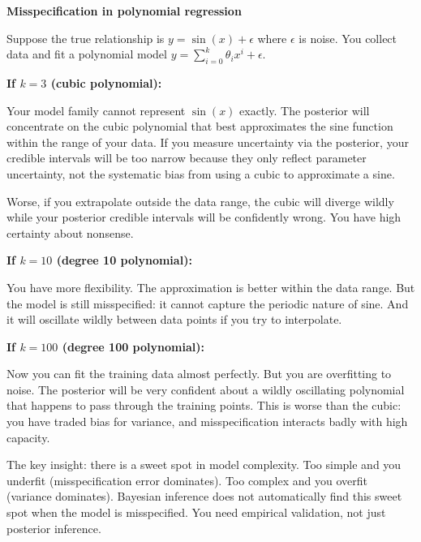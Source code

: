\vspace{1.5em}

\begin{examplebox}
\textbf{Misspecification in polynomial regression}

\vspace{0.5em}

Suppose the true relationship is $y = \sin(x) + \epsilon$ where $\epsilon$ is noise. You collect data and fit a polynomial model $y = \sum_{i=0}^{k} \theta_i x^i + \epsilon$.

\vspace{0.5em}

\textbf{If $k=3$ (cubic polynomial):}

Your model family cannot represent $\sin(x)$ exactly. The posterior will concentrate on the cubic polynomial that best approximates the sine function within the range of your data. If you measure uncertainty via the posterior, your credible intervals will be too narrow because they only reflect parameter uncertainty, not the systematic bias from using a cubic to approximate a sine.

Worse, if you extrapolate outside the data range, the cubic will diverge wildly while your posterior credible intervals will be confidently wrong. You have high certainty about nonsense.

\vspace{0.5em}

\textbf{If $k=10$ (degree 10 polynomial):}

You have more flexibility. The approximation is better within the data range. But the model is still misspecified: it cannot capture the periodic nature of sine. And it will oscillate wildly between data points if you try to interpolate.

\vspace{0.5em}

\textbf{If $k=100$ (degree 100 polynomial):}

Now you can fit the training data almost perfectly. But you are overfitting to noise. The posterior will be very confident about a wildly oscillating polynomial that happens to pass through the training points. This is worse than the cubic: you have traded bias for variance, and misspecification interacts badly with high capacity.

\vspace{0.5em}

The key insight: there is a sweet spot in model complexity. Too simple and you underfit (misspecification error dominates). Too complex and you overfit (variance dominates). Bayesian inference does not automatically find this sweet spot when the model is misspecified. You need empirical validation, not just posterior inference.
\end{examplebox}

